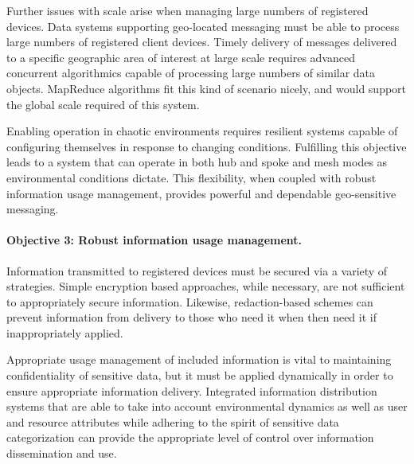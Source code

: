 \documentclass{sbir}
\begin{document}
Further issues with scale arise when managing large numbers of registered devices.  Data systems supporting geo-located messaging must be able to process large numbers of registered client devices.  Timely delivery of messages delivered to a specific geographic area of interest at large scale requires advanced concurrent algorithmics capable of processing large numbers of similar data objects.  MapReduce algorithms fit this kind of scenario nicely, and would support the global scale required of this system.

Enabling operation in chaotic environments requires resilient systems capable of configuring themselves in response to changing conditions.  Fulfilling this objective leads to a system that can operate in both hub and spoke and mesh modes as environmental conditions dictate.  This flexibility, when coupled with robust information usage management, provides powerful and dependable geo-sensitive messaging.

\paragraph{Objective 3: Robust information usage management.} Information transmitted to registered devices must be secured via a variety of strategies.  Simple encryption based approaches, while necessary, are not sufficient to appropriately secure information.  Likewise, redaction-based schemes can prevent information from delivery to those who need it when then need it if inappropriately applied.

Appropriate usage management of included information is vital to maintaining confidentiality of sensitive data, but it must be applied dynamically in order to ensure appropriate information delivery.  Integrated information distribution systems that are able to take into account environmental dynamics as well as user and resource attributes while adhering to the spirit of sensitive data categorization can provide the appropriate level of control over information dissemination and use.
\end{document}
